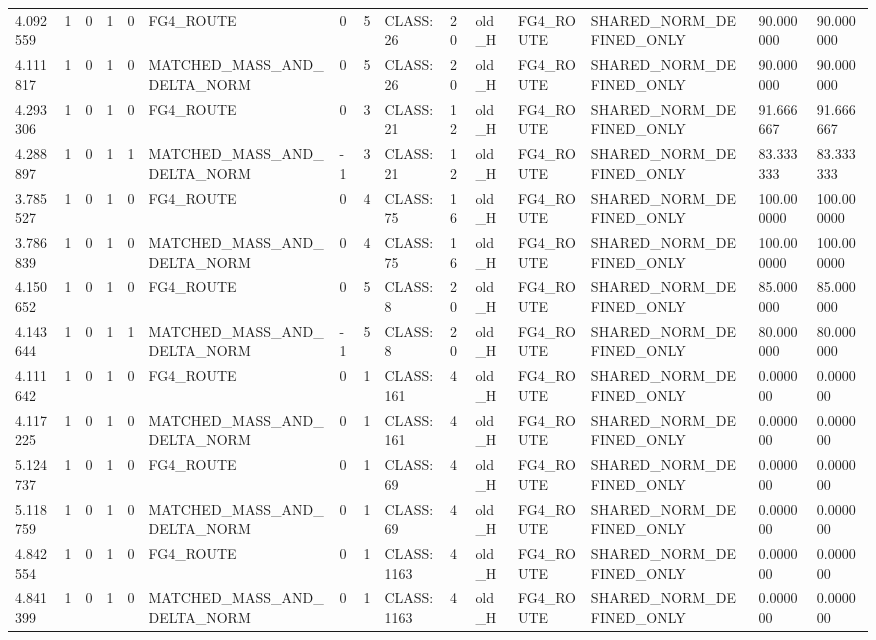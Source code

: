 \begin{tabular}{lllllllllllllll}
4.092559 & 1 & 0 & 1 & 0 & FG4\_ROUTE & 0 & 5 & CLASS:26 & 20 & old\_H & FG4\_ROUTE & SHARED\_NORM\_DEFINED\_ONLY & 90.000000 & 90.000000 \\
4.111817 & 1 & 0 & 1 & 0 & MATCHED\_MASS\_AND\_DELTA\_NORM & 0 & 5 & CLASS:26 & 20 & old\_H & FG4\_ROUTE & SHARED\_NORM\_DEFINED\_ONLY & 90.000000 & 90.000000 \\
4.293306 & 1 & 0 & 1 & 0 & FG4\_ROUTE & 0 & 3 & CLASS:21 & 12 & old\_H & FG4\_ROUTE & SHARED\_NORM\_DEFINED\_ONLY & 91.666667 & 91.666667 \\
4.288897 & 1 & 0 & 1 & 1 & MATCHED\_MASS\_AND\_DELTA\_NORM & -1 & 3 & CLASS:21 & 12 & old\_H & FG4\_ROUTE & SHARED\_NORM\_DEFINED\_ONLY & 83.333333 & 83.333333 \\
3.785527 & 1 & 0 & 1 & 0 & FG4\_ROUTE & 0 & 4 & CLASS:75 & 16 & old\_H & FG4\_ROUTE & SHARED\_NORM\_DEFINED\_ONLY & 100.000000 & 100.000000 \\
3.786839 & 1 & 0 & 1 & 0 & MATCHED\_MASS\_AND\_DELTA\_NORM & 0 & 4 & CLASS:75 & 16 & old\_H & FG4\_ROUTE & SHARED\_NORM\_DEFINED\_ONLY & 100.000000 & 100.000000 \\
4.150652 & 1 & 0 & 1 & 0 & FG4\_ROUTE & 0 & 5 & CLASS:8 & 20 & old\_H & FG4\_ROUTE & SHARED\_NORM\_DEFINED\_ONLY & 85.000000 & 85.000000 \\
4.143644 & 1 & 0 & 1 & 1 & MATCHED\_MASS\_AND\_DELTA\_NORM & -1 & 5 & CLASS:8 & 20 & old\_H & FG4\_ROUTE & SHARED\_NORM\_DEFINED\_ONLY & 80.000000 & 80.000000 \\
4.111642 & 1 & 0 & 1 & 0 & FG4\_ROUTE & 0 & 1 & CLASS:161 & 4 & old\_H & FG4\_ROUTE & SHARED\_NORM\_DEFINED\_ONLY & 0.000000 & 0.000000 \\
4.117225 & 1 & 0 & 1 & 0 & MATCHED\_MASS\_AND\_DELTA\_NORM & 0 & 1 & CLASS:161 & 4 & old\_H & FG4\_ROUTE & SHARED\_NORM\_DEFINED\_ONLY & 0.000000 & 0.000000 \\
5.124737 & 1 & 0 & 1 & 0 & FG4\_ROUTE & 0 & 1 & CLASS:69 & 4 & old\_H & FG4\_ROUTE & SHARED\_NORM\_DEFINED\_ONLY & 0.000000 & 0.000000 \\
5.118759 & 1 & 0 & 1 & 0 & MATCHED\_MASS\_AND\_DELTA\_NORM & 0 & 1 & CLASS:69 & 4 & old\_H & FG4\_ROUTE & SHARED\_NORM\_DEFINED\_ONLY & 0.000000 & 0.000000 \\
4.842554 & 1 & 0 & 1 & 0 & FG4\_ROUTE & 0 & 1 & CLASS:1163 & 4 & old\_H & FG4\_ROUTE & SHARED\_NORM\_DEFINED\_ONLY & 0.000000 & 0.000000 \\
4.841399 & 1 & 0 & 1 & 0 & MATCHED\_MASS\_AND\_DELTA\_NORM & 0 & 1 & CLASS:1163 & 4 & old\_H & FG4\_ROUTE & SHARED\_NORM\_DEFINED\_ONLY & 0.000000 & 0.000000 \\

\end{tabular}
